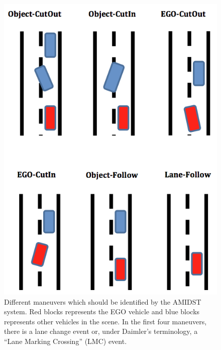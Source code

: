 \begin{figure}
\begin{center}
\includegraphics[scale=0.4]{./figures/DaimlerManeuvers}
\caption{\label{Figure:DaimlerManeuvers}Different maneuvers which should be identified by the AMIDST system.  Red blocks represents the EGO vehicle and blue blocks represents other vehicles in the scene. In the first four maneuvers, there is a lane change event or, under Daimler's terminology, a ``Lane Marking Crossing'' (LMC) event. 
}
\end{center}
\end{figure}

